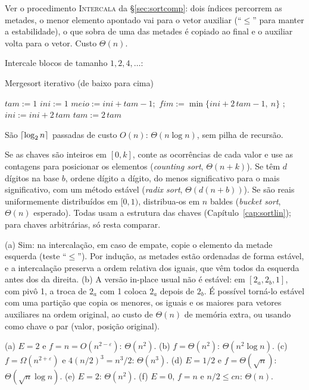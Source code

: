  Ver o procedimento \textsc{Intercala} da §\ref{sec:sortcomp}: dois índices percorrem as metades, o menor elemento apontado vai para o vetor auxiliar (``$\le$'' para manter a estabilidade), o que sobra de uma das metades é copiado ao final e o auxiliar volta para o vetor. Custo $\Theta(n)$.

 Intercale blocos de tamanho $1,2,4,\dots$:
\begin{pseudo}{Mergesort iterativo (de baixo para cima)}
\begin{algorithmic}
\State $tam:=1$
  \State $ini:=1$
    \State $meio:=ini+tam-1$;\ $fim:=\min\{ini+2\,tam-1,\ n\}$
    \State {};\ $ini:=ini+2\,tam$
  \EndWhile
  \State $tam:=2\,tam$
\EndWhile
\end{algorithmic}
\end{pseudo}
São $\lceil\log_2n\rceil$ passadas de custo $O(n)$: $\Theta(n\log n)$, sem pilha de recursão.

 Se as chaves são inteiros em $[0,k]$, conte as ocorrências de cada valor e use as contagens para posicionar os elementos (\emph{counting sort}, $\Theta(n+k)$). Se têm $d$ dígitos na base $b$, ordene dígito a dígito, do menos significativo para o mais significativo, com um método estável (\emph{radix sort}, $\Theta(d(n+b))$). Se são reais uniformemente distribuídos em $[0,1)$, distribua-os em $n$ baldes (\emph{bucket sort}, $\Theta(n)$ esperado). Todas usam a estrutura das chaves (Capítulo~\ref{cap:sortlin}); para chaves arbitrárias, só resta comparar.

 (a) Sim: na intercalação, em caso de empate, copie o elemento da metade esquerda (teste ``$\le$''). Por indução, as metades estão ordenadas de forma estável, e a intercalação preserva a ordem relativa dos iguais, que vêm todos da esquerda antes dos da direita. (b) A versão in-place usual não é estável: em $[2_a,2_b,1]$, com pivô 1, a troca de $2_a$ com 1 coloca $2_a$ depois de $2_b$. É possível torná-lo estável com uma partição que copia os menores, os iguais e os maiores para vetores auxiliares na ordem original, ao custo de $\Theta(n)$ de memória extra, ou usando como chave o par (valor, posição original).

 (a) $E=2$ e $f=n=O(n^{2-\varepsilon})$: $\Theta(n^2)$. (b) $f=\Theta(n^2)$: $\Theta(n^2\log n)$. (c) $f=\Omega(n^{2+\varepsilon})$ e $4(n/2)^3=n^3/2$: $\Theta(n^3)$. (d) $E=1/2$ e $f=\Theta(\sqrt n)$: $\Theta(\sqrt n\log n)$. (e) $E=2$: $\Theta(n^2)$. (f) $E=0$, $f=n$ e $n/2\le cn$: $\Theta(n)$.


